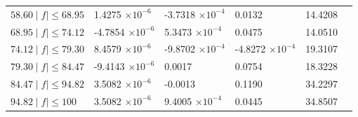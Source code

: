 \documentclass[journal]{IEEEtran}
\begin{document}
\begin{table}[h!]
\begin{tabular}{|C{3.5cm}|C{2.5cm}|C{2.5cm}|C{2.5cm}|C{2.5cm}|m{0cm}}
		$58.60 \mid f\mid \leq 68.95$ & 1.4275  $\times 10^{-6}$  & -3.7318 $\times 10^{-4}$ & 0.0132 					& 14.4208 &\\ 
		$68.95 \mid f\mid \leq 74.12$ & -4.7854 $\times 10^{-6}$  & 5.3473 $\times 10^{-4}$  & 0.0475 					& 14.0510 &\\ 
		$74.12 \mid f\mid \leq 79.30$ & 8.4579  $\times 10^{-6}$  & -9.8702 $\times 10^{-4}$ & -4.8272 $\times 10^{-4}$& 19.3107 &\\ 
		$79.30 \mid f\mid \leq 84.47$ & -9.4143 $\times 10^{-6}$  & 0.0017 				  & 0.0754 					& 18.3228 &\\ 
		$84.47 \mid f\mid \leq 94.82$ & 3.5082 $\times 10^{-6}$   & -0.0013 				  & 0.1190					& 34.2297 &\\ 
		$94.82 \mid f\mid \leq 100$   & 3.5082 $\times 10^{-6}$   & 9.4005 $\times 10^{-4}$  & 0.0445 					& 34.8507 &\\ 
	\end{tabular}
\end{table}
\end{document}
